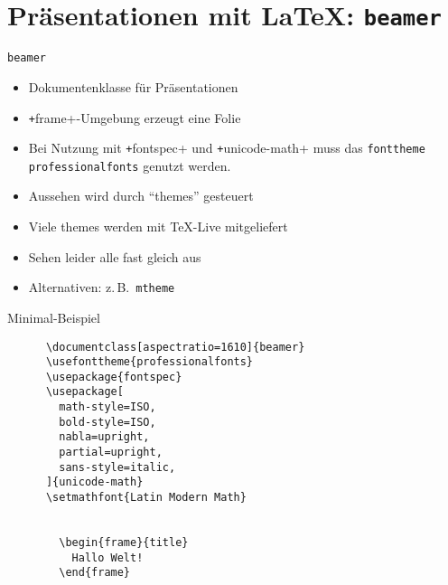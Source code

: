\section{Präsentationen mit \LaTeX: \texttt{beamer}}

\begin{frame}[fragile]{
  \texttt{beamer}
  \hfill
}
  \begin{itemize}
    \item Dokumentenklasse für Präsentationen
    \item \texttt+frame+-Umgebung erzeugt eine Folie
    \item Bei Nutzung mit \texttt+fontspec+ und \texttt+unicode-math+ muss das \texttt{fonttheme} \texttt{professionalfonts} genutzt werden.
    \item Aussehen wird durch \enquote{themes} gesteuert
    \item Viele themes werden mit \TeX-Live mitgeliefert
    \item Sehen leider alle fast gleich aus
    \item Alternativen: z.\,B.~\texttt{mtheme}
  \end{itemize}
\end{frame}

\begin{BeamerCodeFrame}[fragile]{Minimal-Beispiel}
  \begin{center}
    \begin{verbatim}
      \documentclass[aspectratio=1610]{beamer}
      \usefonttheme{professionalfonts}
      \usepackage{fontspec}
      \usepackage[
        math-style=ISO,
        bold-style=ISO,
        nabla=upright,
        partial=upright,
        sans-style=italic,
      ]{unicode-math}
      \setmathfont{Latin Modern Math}

      
        \begin{frame}{title}
          Hallo Welt!
        \end{frame}
      
    \end{verbatim}
  \end{center}
\end{BeamerCodeFrame}

